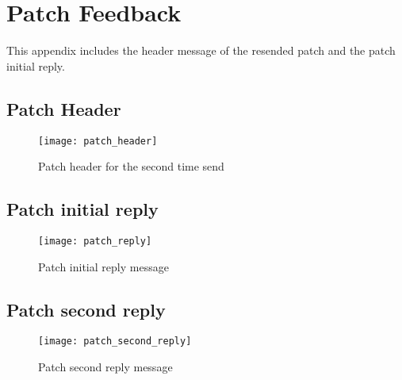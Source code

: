 \chapter{Patch Feedback}

\label{app:feedback}

This appendix includes the header message of the resended patch and the 
patch initial reply.

\section{Patch Header} 

\begin{figure}
\texttt{[image: patch\_header]}
\caption{Patch header for the second time send}
\label{fig:patch_header}
\end{figure}

\newpage

\section{Patch initial reply}

\begin{figure}
\texttt{[image: patch\_reply]}
\caption{Patch initial reply message}
\label{fig:patch_reply}
\end{figure}

\newpage

\section{Patch second reply}

\begin{figure}
\texttt{[image: patch\_second\_reply]}
\caption{Patch second reply message}
\label{fig:patch_second_reply}
\end{figure}
